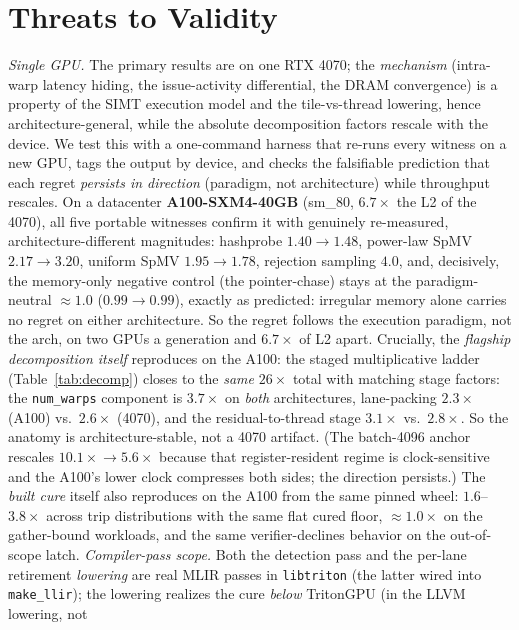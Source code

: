 \documentclass[sigplan,review,anonymous,10pt]{acmart}
\begin{document}
\section{Threats to Validity}
\emph{Single GPU.} The primary results are on one RTX 4070; the \emph{mechanism} (intra-warp latency
hiding, the issue-activity differential, the DRAM convergence) is a property of the SIMT execution model
and the tile-vs-thread lowering, hence architecture-general, while the absolute decomposition factors
rescale with the device. We test this with a one-command harness that re-runs every witness on a new GPU,
tags the output by device, and checks the falsifiable prediction that each regret \emph{persists in
direction} (paradigm, not architecture) while throughput rescales. On a datacenter \textbf{A100-SXM4-40GB}
(sm\_80, $6.7\times$ the L2 of the 4070), all five portable witnesses confirm it with genuinely
re-measured, architecture-different magnitudes: hashprobe $1.40\!\to\!1.48$, power-law SpMV
$2.17\!\to\!3.20$, uniform SpMV $1.95\!\to\!1.78$, rejection sampling $4.0$, and, decisively, the
memory-only negative control (the pointer-chase) stays at the paradigm-neutral $\approx\!1.0$
($0.99\!\to\!0.99$), exactly as predicted: irregular memory alone carries no regret on either
architecture. So the regret follows the execution paradigm, not the arch, on two GPUs a generation and
$6.7\times$ of L2 apart. Crucially, the \emph{flagship decomposition itself} reproduces on the A100: the staged multiplicative ladder (Table~\ref{tab:decomp}) closes to the \emph{same} $26\times$ total with matching stage factors: the \texttt{num\_warps} component is $3.7\times$ on \emph{both} architectures, lane-packing $2.3\times$ (A100) vs.\ $2.6\times$ (4070), and the residual-to-thread stage $3.1\times$ vs.\ $2.8\times$. So the anatomy is architecture-stable, not a 4070 artifact. (The batch-4096 anchor rescales $10.1\times\!\to\!5.6\times$ because that register-resident regime is clock-sensitive and the A100's lower clock compresses both sides; the direction persists.) The \emph{built cure} itself also reproduces on the A100 from the same pinned wheel:
$1.6$--$3.8\times$ across trip distributions with the same flat cured floor, ${\approx}1.0\times$ on the
gather-bound workloads, and the same verifier-declines behavior on the out-of-scope latch.
\emph{Compiler-pass scope.} Both the detection pass and the per-lane
retirement \emph{lowering} are real MLIR passes in \texttt{libtriton} (the latter wired into
\texttt{make\_llir}); the lowering realizes the cure \emph{below} TritonGPU (in the LLVM lowering, not
\end{document}
